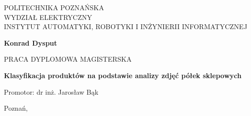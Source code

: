 \documentclass[12pt,a4paper,leqno,oneside,titlepage]{mwrep}
\begin{document}
\begin{titlepage}
\begin{center}
{\large POLITECHNIKA POZNAŃSKA\\ WYDZIAŁ ELEKTRYCZNY\\ INSTYTUT AUTOMATYKI, ROBOTYKI I INŻYNIERII INFORMATYCZNEJ\par}
\end{center}
\vspace{1.5cm plus 1fill}
\begin{center}
{\bf \Large Konrad Dysput\par}
\end{center}
\vspace{1.5cm plus 1mm minus 2mm}
\begin{center}
{\large PRACA DYPLOMOWA MAGISTERSKA\par}
\end{center}
\vspace{1.5cm plus 1mm minus 2mm}
\begin{center}
{\huge\textbf{Klasyfikacja produktów na podstawie analizy zdjęć półek sklepowych }\par}
\vspace{1.5cm plus 1.5fill}
\begin{flushright}
{\large Promotor: dr inż. Jarosław Bąk}
\end{flushright}
\vspace{4cm plus .1fill}
{\large Poznań,\par}
\end{center}
\end{titlepage}
\shipout\null

\phantom{.}

\vspace{16cm} \hspace{1cm}\phantom{.}\\
\phantom{.}\hspace{6cm}{Składam serdeczne podziękowania}\\
\phantom{.}\hspace{6cm}{mojej dziewczynie za wsparcie i cierpliwość, }\\
\phantom{.}\hspace{6cm}{mamie za motywację, }\\
\phantom{.}\hspace{6cm}{oraz dr Jarosławowi Bąkowi}\\
\phantom{.}\hspace{6cm}{za nieocenioną pomoc przy pisaniu tej pracy.}\\
\end{document}
